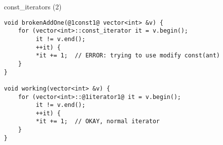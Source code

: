 \begin{frame}[fragile,label=constIt2]{const\_iterators (2)}
\begin{lstlisting}
void brokenAddOne(@1const1@ vector<int> &v) {
    for (vector<int>::const_iterator it = v.begin();
         it != v.end();
         ++it) {
         *it += 1;  // ERROR: trying to use modify const(ant)
    }
}

void working(vector<int> &v) {
    for (vector<int>::@1iterator1@ it = v.begin();
         it != v.end();
         ++it) {
         *it += 1;  // OKAY, normal iterator
    }
}
\end{lstlisting}
\end{frame}
